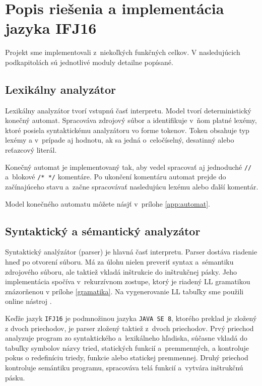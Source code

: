 \documentclass[11pt,a4paper]{article}
\begin{document}
	
	\section{Popis riešenia a implementácia jazyka IFJ16}
	\label{popis}
	
	Projekt sme implementovali z~niekoľkých funkčných celkov. V nasledujúcich podkapitolách sú jednotlivé moduly detailne popísané.
	
	\subsection{Lexikálny analyzátor}
	\label{lexer}
	Lexikálny analyzátor tvorí vstupnú časť interpretu. Model tvorí deterministický
	konečný automat. Spracováva zdrojový súbor a identifikuje v~ňom platné lexémy,
	ktoré posiela syntaktickému analyzátoru vo forme tokenov. Token obsahuje typ lexémy
	a v~prípade aj hodnotu, ak sa jedná o~celočíselný, desatinný alebo reťazcový literál.
	
	Konečný automat je implementovaný tak, aby vedel spracovať aj jednoduché \texttt{//}
	a~blokové \texttt{/* */} komentáre. Po ukončení komentáru  automat prejde do
	začínajúceho stavu a~začne spracovávať nasledujúcu lexému alebo ďalší komentár.
	
	Model konečného automatu môžete násjť v~prílohe \ref{app:automat}.
	
	
	\subsection{Syntaktický a sémantický analyzátor}
	\label{parser}
	Syntaktický analýzátor (parser) je hlavná časť interpretu. Parser dostáva
	riadenie hneď po otvorení súboru. Má za úlohu nielen preveriť syntax
	a~sémantiku zdrojového súboru, ale taktiež vkladá inštrukcie do inštrukčnej
	pásky. Jeho implementácia spočíva v~rekurzívnom zostupe, ktorý je riadený
	LL gramatikou znázorňenou v prílohe \ref{gramatika}. Na vygenerovanie
	LL tabuľky sme použili online nástroj \cite{aLLT}.
	
	Keďže jazyk \texttt{IFJ16} je podmnožinou jazyka \texttt{JAVA SE 8},
	ktorého preklad je zložený z dvoch priechodov, je parser zložený
	taktiež z~dvoch priechodov. Prvý priechod analyzuje program zo syntaktického
	a~lexikálneho hľadiska, súčasne vkladá do tabuľky symbolov názvy tried,
	statických funkcií a~premmenných, a kontroluje pokus o redefiníciu triedy,
	funkcie alebo statickej premmennej. Druhý priechod kontroluje semántiku
	programu, spracováva telá funkcií a~vytvára inštrukčnú pásku.
	
\end{document}
